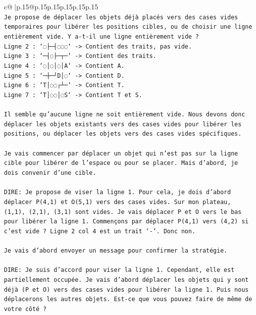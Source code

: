 \documentclass{article}
\begin{document}
{\begin{supertabular}{c@{$\;$}|p{.15\linewidth}@{}p{.15\linewidth}p{.15\linewidth}p{.15\linewidth}p{.15\linewidth}p{.15\linewidth}}
{{{\\ 
\texttt{Je propose de déplacer les objets déjà placés vers des cases vides temporaires pour libérer les positions cibles, ou de choisir une ligne entièrement vide. Y a{-}t{-}il une ligne entièrement vide ?} \\
\texttt{Ligne 2 : `◌├─┤◌◌◌` {-}> Contient des traits, pas vide.} \\
\texttt{Ligne 3 : `─┤◌├─┬─` {-}> Contient des traits.} \\
\texttt{Ligne 4 : `◌│◌│◌│A` {-}> Contient A.} \\
\texttt{Ligne 5 : `─┼─┘D│◌` {-}> Contient D.} \\
\texttt{Ligne 6 : `T│◌◌┌┴─` {-}> Contient T.} \\
\texttt{Ligne 7 : `T│◌◌│◌S` {-}> Contient T et S.} \\
\\ 
\texttt{Il semble qu'aucune ligne ne soit entièrement vide. Nous devons donc déplacer les objets existants vers des cases vides pour libérer les positions, ou déplacer les objets vers des cases vides spécifiques.} \\
\\ 
\texttt{Je vais commencer par déplacer un objet qui n'est pas sur la ligne cible pour libérer de l'espace ou pour se placer. Mais d'abord, je dois convenir d'une cible.} \\
\\ 
\texttt{DIRE: Je propose de viser la ligne 1. Pour cela, je dois d'abord déplacer P(4,1) et O(5,1) vers des cases vides. Sur mon plateau, (1,1), (2,1), (3,1) sont vides. Je vais déplacer P et O vers le bas pour libérer la ligne 1. Commençons par déplacer P(4,1) vers (4,2) si c'est vide ? Ligne 2 col 4 est un trait `{-}`. Donc non.} \\
\\ 
\texttt{Je vais d'abord envoyer un message pour confirmer la stratégie.} \\
\\ 
\texttt{DIRE: Je suis d'accord pour viser la ligne 1. Cependant, elle est partiellement occupée. Je vais d'abord déplacer les objets qui y sont déjà (P et O) vers des cases vides pour libérer la ligne 1. Puis nous déplacerons les autres objets. Est{-}ce que vous pouvez faire de même de votre côté ?} \\
            }
        }
    }
     \\ \\


\end{supertabular}}
\end{document}
